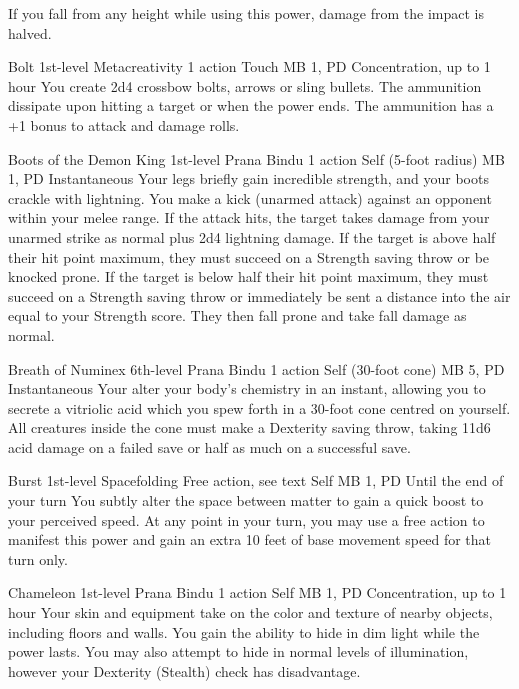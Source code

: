 If you fall from any height while using this power,
damage from the impact is halved.

\DndPowerHeader%
  {Bolt}
  {1st-level Metacreativity}
  {1 action}
  {Touch}
  {MB 1, PD \lvlone}
  {Concentration, up to 1 hour}
You create 2d4 crossbow bolts, arrows or sling bullets.
The ammunition dissipate upon hitting a target
or when the power ends.
The ammunition has a +1 bonus to attack and damage rolls.

\DndPowerHeader%
  {Boots of the Demon King}
  {1st-level Prana Bindu}
  {1 action}
  {Self (5-foot radius)}
  {MB 1, PD \lvlone}
  {Instantaneous}
Your legs briefly gain incredible strength,
and your boots crackle with lightning.
You make a kick (unarmed attack) against an
opponent within your melee range.
If the attack hits,
the target takes damage from your unarmed strike
as normal plus 2d4 lightning damage.
If the target is above half their hit point maximum,
they must succeed on a Strength saving throw or be knocked prone.
If the target is below half their hit point maximum,
they must succeed on a Strength saving throw or immediately
be sent a distance into the air equal to your Strength score.
They then fall prone and take fall damage as normal.

\DndPowerHeader%
  {Breath of Numinex}
  {6th-level Prana Bindu}
  {1 action}
  {Self (30-foot cone)}
  {MB 5, PD \lvlsix}
  {Instantaneous}
Your alter your body's chemistry in an instant,
allowing you to secrete a vitriolic acid
which you spew forth in a 30-foot cone
centred on yourself.
All creatures inside the cone must make a
Dexterity saving throw,
taking 11d6 acid damage on a failed save
or half as much on a successful save. 

\DndPowerHeader%
  {Burst}
  {1st-level Spacefolding}
  {Free action, see text}
  {Self}
  {MB 1, PD \lvlone}
  {Until the end of your turn}
You subtly alter the space between matter
to gain a quick boost to your perceived speed.
At any point in your turn,
you may use a free action to manifest this power
and gain an extra 10 feet of base movement speed
for that turn only.

\DndPowerHeader%
  {Chameleon}
  {1st-level Prana Bindu}
  {1 action}
  {Self}
  {MB 1, PD \lvlone}
  {Concentration, up to 1 hour}
  Your skin and equipment take on the color and texture
  of nearby objects,
  including floors and walls.
  You gain the ability to hide in dim light
  while the power lasts.
  You may also attempt to hide in normal levels
  of illumination,
  however your Dexterity (Stealth) check has disadvantage.

